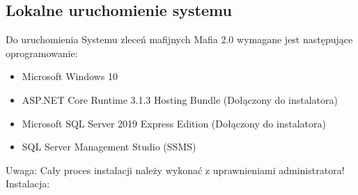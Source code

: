 \documentclass[12pt,a4paper]{article}
\begin{document}
		\subsection{Lokalne uruchomienie systemu}
			\indent Do uruchomienia Systemu zleceń mafijnych Mafia 2.0 wymagane jest następujące oprogramowanie:
			\begin{itemize}
				\item Microsoft Windows 10
				\item ASP.NET Core Runtime 3.1.3 Hosting Bundle (Dołączony do instalatora)
				\item Microsoft SQL Server 2019 Express Edition (Dołączony do instalatora)
				\item SQL Server Management Studio (SSMS)
			\end{itemize}
			Uwaga: Cały proces instalacji należy wykonać z uprawnieniami administratora!\\
			Instalacja:
\end{document}
